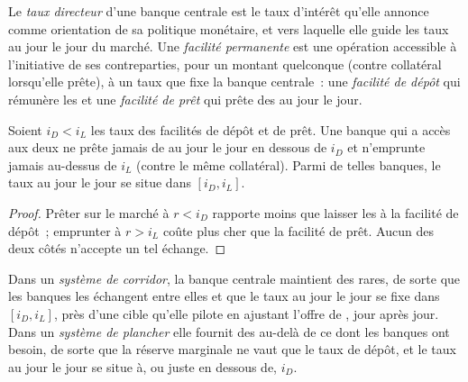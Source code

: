 \begin{definition}\label{def:m2:central-banks-and-the-short-rate:policy}
Le \emph{taux directeur} d'une banque centrale est le taux d'intérêt
qu'elle annonce comme orientation de sa politique monétaire, et vers laquelle elle guide les
taux au jour le jour du marché. Une \emph{facilité permanente}
est une opération accessible à l'initiative de ses contreparties, pour un montant
quelconque (contre collatéral lorsqu'elle prête), à un taux que fixe la banque centrale~: une
\emph{facilité de dépôt} qui rémunère les  et une \emph{facilité de
prêt} qui prête des  au jour le jour.
\end{definition}

\begin{proposition}\label{prop:m2:central-banks-and-the-short-rate:bounds}
Soient $i_D < i_L$ les taux des facilités de dépôt et de prêt. Une banque
qui a accès aux deux ne prête jamais de  au jour le jour en dessous de $i_D$ et
n'emprunte jamais au-dessus de $i_L$ (contre le même collatéral). Parmi de telles banques, le
taux au jour le jour se situe dans $[i_D, i_L]$.
\end{proposition}
\begin{proof}
Prêter sur le marché à $r < i_D$ rapporte moins que laisser les  à la
facilité de dépôt~; emprunter à $r > i_L$ coûte plus cher que la facilité de
prêt. Aucun des deux côtés n'accepte un tel échange.
\end{proof}

\begin{definition}\label{def:m2:central-banks-and-the-short-rate:corridor}
Dans un \emph{système de corridor}, la banque centrale maintient
des  rares, de sorte que les banques les échangent entre elles et que le taux au jour le jour
se fixe dans $[i_D, i_L]$, près d'une cible qu'elle pilote en ajustant
l'offre de , jour après jour. Dans un \emph{système de plancher}
elle fournit des  au-delà de ce dont les banques ont besoin, de sorte que la réserve marginale
ne vaut que le taux de dépôt, et le taux au jour le jour se situe à, ou juste en dessous de,
$i_D$.
\end{definition}


